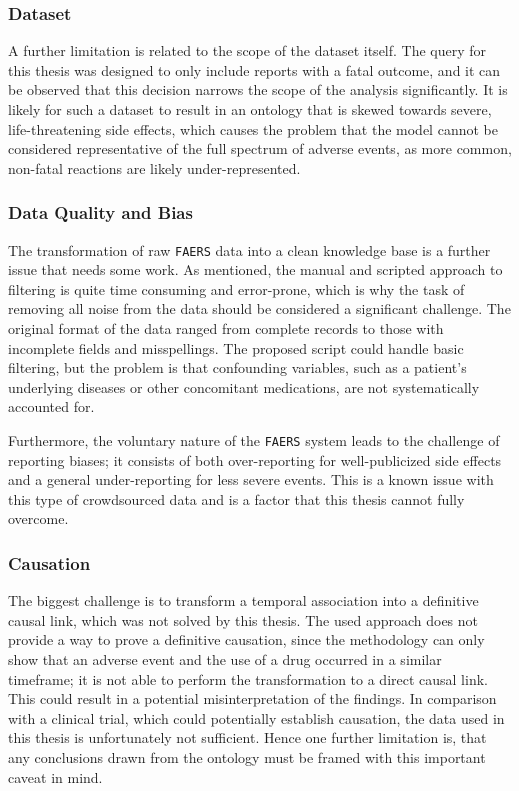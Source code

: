\subsubsection*{Dataset}
A further limitation is related to the scope of the dataset itself. The query for this thesis was designed to only include reports with a fatal outcome, and it can be observed that this decision narrows the scope of the analysis significantly. It is likely for such a dataset to result in an ontology that is skewed towards severe, life-threatening side effects, which causes the problem that the model cannot be considered representative of the full spectrum of adverse events, as more common, non-fatal reactions are likely under-represented.

\subsubsection*{Data Quality and Bias}
The transformation of raw \texttt{FAERS} data into a clean knowledge base is a further issue that needs some work. As mentioned, the manual and scripted approach to filtering is quite time consuming and error-prone, which is why the task of removing all noise from the data should be considered a significant challenge. The original format of the data ranged from complete records to those with incomplete fields and misspellings. The proposed script could handle basic filtering, but the problem is that confounding variables, such as a patient's underlying diseases or other concomitant medications, are not systematically accounted for.

Furthermore, the voluntary nature of the \texttt{FAERS} system leads to the challenge of reporting biases; it consists of both over-reporting for well-publicized side effects and a general under-reporting for less severe events. This is a known issue with this type of crowdsourced data and is a factor that this thesis cannot fully overcome.

\subsubsection*{Causation}
The biggest challenge is to transform a temporal association into a definitive causal link, which was not solved by this thesis. The used approach does not provide a way to prove a definitive causation, since the methodology can only show that an adverse event and the use of a drug occurred in a similar timeframe; it is not able to perform the transformation to a direct causal link. This could result in a potential misinterpretation of the findings. In comparison with a clinical trial, which could potentially establish causation, the data used in this thesis is unfortunately not sufficient. Hence one further limitation is, that any conclusions drawn from the ontology must be framed with this important caveat in mind.
